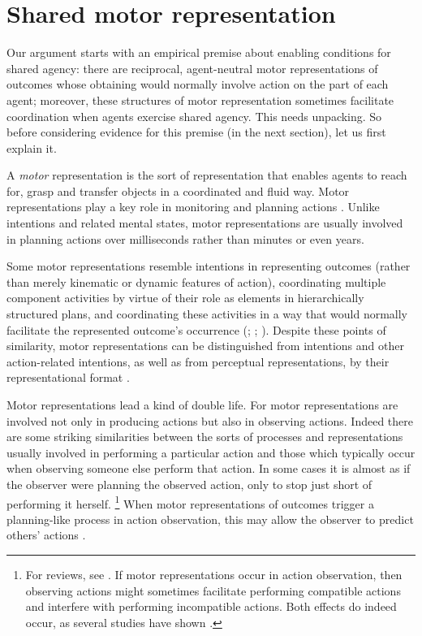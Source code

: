 \documentclass[12pt,\papersize]{extarticle}
\begin{document}
\section{Shared motor representation}
Our argument starts with an empirical premise about enabling conditions for shared agency: there are reciprocal, agent-neutral motor representations of outcomes whose obtaining would normally involve action on the part of each agent;
moreover, these structures of motor representation sometimes facilitate coordination when agents exercise shared agency.
This needs unpacking. 
So before considering evidence for this premise (in the next section), let us first explain  it.

A \textit{motor} representation is the sort of representation that enables agents to reach for, grasp and transfer objects in a coordinated and fluid way. 
Motor representations play a key role in monitoring and planning actions  \citep[e.g.][]{wolpert:1995internal, miall:1996_forward,Wilson:2005qu}.
Unlike intentions and related mental states, motor representations are usually involved in planning actions over milliseconds rather than minutes or even years.

Some motor representations resemble intentions  in 
	representing outcomes (rather than merely kinematic or dynamic features of action), 
	coordinating multiple  component activities by virtue of their role as elements in hierarchically structured plans,
	and coordinating these activities in a way that would normally facilitate the represented outcome's occurrence (\citealp{hamilton_action_2008}; \citealp[pp.\ 189-90]{pacherie:2008_action}; \citealp{butterfill:2012_intention}).
Despite these points of similarity, 
motor representations can be distinguished from intentions and other action-related intentions,
	 as well as from perceptual representations,
	 by their representational format \citep{butterfill:2012_intention}. 

Motor representations lead a kind of double life.
For motor representations are involved not only in producing actions but also in observing actions. 
Indeed there are some striking similarities between the sorts of processes and representations usually involved in performing a particular action and those which typically occur when observing someone else perform that action.
In some cases it is almost as if the observer were planning the observed action, only to stop just short of performing it herself.%
\footnote{ 
For reviews, see \citet{jeannerod_motor_2006,rizzolatti_mirrors_2008,rizzolatti_functional_2010}.
If motor representations occur in action observation, then observing actions might sometimes facilitate performing compatible actions and interfere with performing incompatible actions.  Both effects do indeed occur, as several studies have shown \citep{brass:2000_compatibility, craighero:2002_hand, kilner:2003_interference, costantini:2012_does}. 
}
When motor representations of outcomes trigger a planning-like process in action observation, this may allow the observer to predict others' actions \citep{Flanagan:2003lm,ambrosini:2011_grasping,ambrosini:2012_tie,Costantini:2012fk}.
\end{document}
